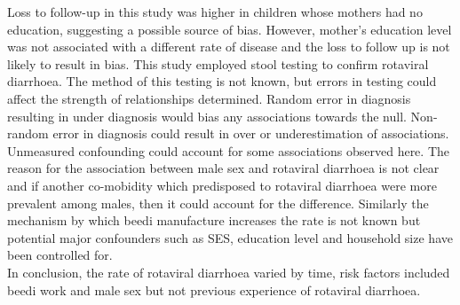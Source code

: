 \documentclass[11pt,a4paper]{article}\usepackage{graphicx, color}
\begin{document}
Loss to follow-up in this study was higher in children whose mothers had no education, suggesting a possible source of bias. 
However, mother's education level was not associated with a different rate of disease and the loss to follow up is not likely to result in bias. 
This study employed stool testing to confirm rotaviral diarrhoea.
The method of this testing is not known, but errors in testing could affect the strength of relationships determined.
Random error in diagnosis resulting in under diagnosis would bias any associations towards the null.
Non-random error in diagnosis could result in over or underestimation of associations.\\
\indent Unmeasured confounding could account for some associations observed here. 
The reason for the association between male sex and rotaviral diarrhoea is not clear and if another co-mobidity which predisposed to rotaviral diarrhoea were more prevalent among males, then it could account for the difference. 
Similarly the mechanism by which beedi manufacture increases the rate is not known but potential major confounders such as SES, education level and household size have been controlled for. \\
\indent In conclusion, the rate of rotaviral diarrhoea varied by time, risk factors included beedi work and male sex but not previous experience of rotaviral diarrhoea.
\end{document}
